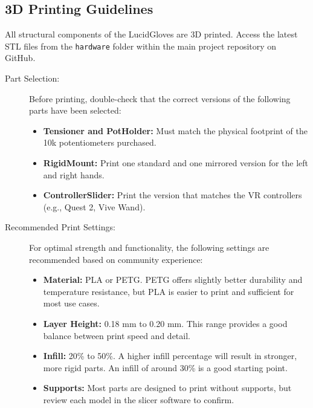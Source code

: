 \documentclass{article}
\begin{document}
\subsection{3D Printing Guidelines}
All structural components of the LucidGloves are 3D printed. Access the latest STL files from the \texttt{hardware} folder within the main project repository on GitHub.
\begin{description}
    \item[Part Selection:] Before printing, double-check that the correct versions of the following parts have been selected:
    \begin{itemize}
        \item \textbf{Tensioner and PotHolder:} Must match the physical footprint of the 10k potentiometers purchased.
        \item \textbf{RigidMount:} Print one standard and one mirrored version for the left and right hands.
        \item \textbf{ControllerSlider:} Print the version that matches the VR controllers (e.g., Quest 2, Vive Wand).
    \end{itemize}
    \item[Recommended Print Settings:] For optimal strength and functionality, the following settings are recommended based on community experience:
    \begin{itemize}
        \item \textbf{Material:} PLA or PETG. PETG offers slightly better durability and temperature resistance, but PLA is easier to print and sufficient for most use cases.
        \item \textbf{Layer Height:} 0.18 mm to 0.20 mm. This range provides a good balance between print speed and detail.
        \item \textbf{Infill:} 20\% to 50\%. A higher infill percentage will result in stronger, more rigid parts. An infill of around 30\% is a good starting point.
        \item \textbf{Supports:} Most parts are designed to print without supports, but review each model in the slicer software to confirm.
    \end{itemize}
\end{description}
\end{document}
